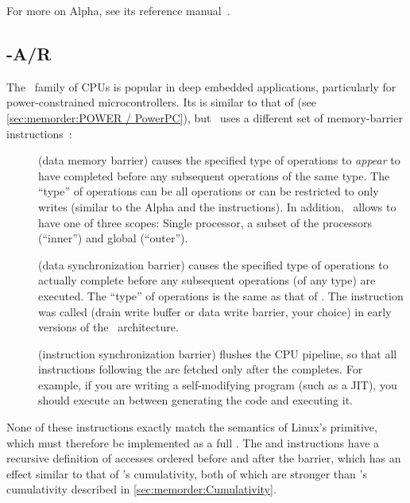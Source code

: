 For more on Alpha, see its reference manual~\cite{ALPHA2002}.

\subsection{-A/R}
\label{sec:memorder:ARMv7-A/R}

The \ARM\ family of CPUs is popular in deep embedded applications,
particularly for power-constrained microcontrollers.
Its  is similar to that of \Power{}
(see \cref{sec:memorder:POWER / PowerPC}), but \ARM\ uses a
different set of memory-barrier instructions~\cite{ARMv7A:2010}:

\begin{description}
\item	[] (data memory barrier) causes the specified type of
	operations to \emph{appear} to have completed before any
	subsequent operations of the same type.
	The ``type'' of operations can be all operations or can be
	restricted to only writes (similar to the Alpha 
	and the \Power{}  instructions).
	In addition, \ARM\ allows  to have one of three
	scopes:
	Single processor, a subset of the processors
	(``inner'') and global (``outer'').
\item	[] (data synchronization barrier) causes the specified
	type of operations to actually complete before any subsequent
	operations (of any type) are executed.
	The ``type'' of operations is the same as that of .
	The  instruction was called  (drain write buffer
	or data write barrier, your choice) in early versions of the
	\ARM\ architecture.
\item	[] (instruction synchronization barrier) flushes the CPU
	pipeline, so that all instructions following the 
	are fetched only after the  completes.
	For example, if you are writing a self-modifying program
	(such as a JIT), you should execute an  between
	generating the code and executing it.
\end{description}

None of these instructions exactly match the semantics of Linux's
 primitive, which must therefore be implemented as a full
.
The  and  instructions have a recursive definition
of accesses ordered before and after the barrier, which has an effect
similar to that of \Power{}'s cumulativity, both of which are
stronger than 's
cumulativity described in
\cref{sec:memorder:Cumulativity}.

